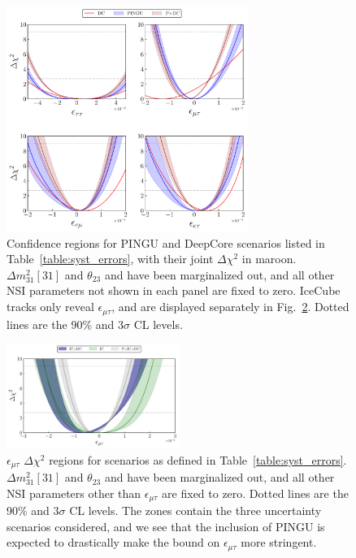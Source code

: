 \documentclass{revtex4-2}
\newcommand{\emt}{\ensuremath{\epsilon_{\mu\tau}}}
\newcommand{\dm}{\Delta m^2_{31}}
\begin{document}
{\begin{figure}
    \begin{center}
       \includegraphics[width = 0.7\textwidth]{figures/joint_3D_NO.pdf}
       \caption{Confidence regions for PINGU and DeepCore scenarios listed in Table~\ref{table:syst_errors}, with their joint $\Delta \chi^2$ in maroon. $\dm[31]$ and $\theta_{23}$ and have been marginalized out, and all other NSI 
       parameters not shown in each panel are fixed to zero. 
       IceCube tracks only reveal $\emt$, and are displayed separately in Fig.~\ref{fig:IC_3D}. Dotted lines are the 90\% and $3\sigma$ CL levels.}\label{fig:3D_NO}
    \end{center}
 \end{figure} 
 \begin{figure}
    \begin{center} 
       \includegraphics[width=0.5\textwidth]{figures/PID_3D_emt.pdf}
       \caption{$\emt$ $\Delta \chi^2$ regions for scenarios as defined in Table~\ref{table:syst_errors}.
     $\dm[31]$ and $\theta_{23}$ and have been marginalized out, and all other NSI 
     parameters other than $\emt$ are fixed to zero. Dotted lines are the 90\% and $3\sigma$ CL levels.
     The zones contain the three uncertainty scenarios considered, and we see that the inclusion of PINGU is expected 
     to drastically make the bound on $\emt$ more stringent.
     }\label{fig:IC_3D}
    \end{center}
 \end{figure}
 
}
\end{document}
